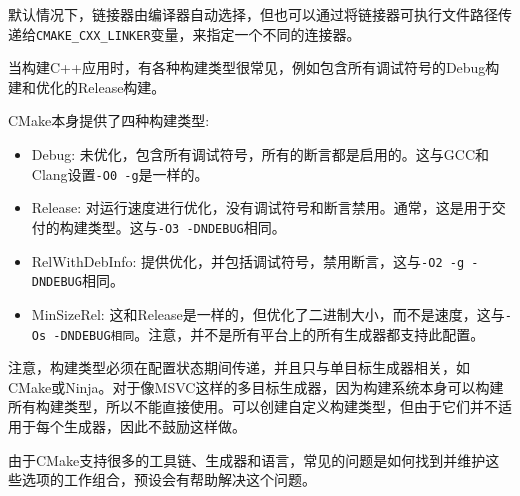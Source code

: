 默认情况下，链接器由编译器自动选择，但也可以通过将链接器可执行文件路径传递给\texttt{CMAKE\_CXX\_LINKER}变量，来指定一个不同的连接器。


当构建C++应用时，有各种构建类型很常见，例如包含所有调试符号的Debug构建和优化的Release构建。

CMake本身提供了四种构建类型:

\begin{itemize}
\item 
Debug: 未优化，包含所有调试符号，所有的断言都是启用的。这与GCC和Clang设置\texttt{-O0 -g}是一样的。

\item 
Release: 对运行速度进行优化，没有调试符号和断言禁用。通常，这是用于交付的构建类型。这与\texttt{-O3 -DNDEBUG}相同。

\item 
RelWithDebInfo: 提供优化，并包括调试符号，禁用断言，这与\texttt{-O2 -g -DNDEBUG}相同。

\item 
MinSizeRel: 这和Release是一样的，但优化了二进制大小，而不是速度，这与\texttt{-Os -DNDEBUG相同}。注意，并不是所有平台上的所有生成器都支持此配置。
\end{itemize}

注意，构建类型必须在配置状态期间传递，并且只与单目标生成器相关，如CMake或Ninja。对于像MSVC这样的多目标生成器，因为构建系统本身可以构建所有构建类型，所以不能直接使用。可以创建自定义构建类型，但由于它们并不适用于每个生成器，因此不鼓励这样做。

由于CMake支持很多的工具链、生成器和语言，常见的问题是如何找到并维护这些选项的工作组合，预设会有帮助解决这个问题。



































